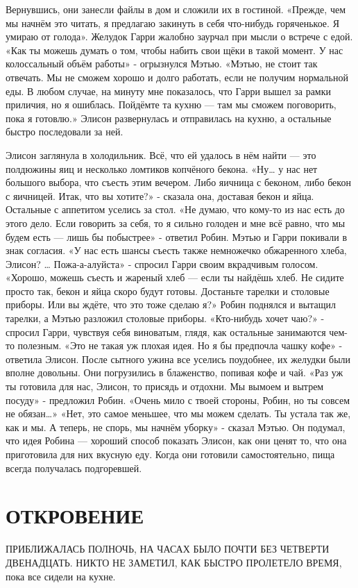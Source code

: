 \documentclass[a4paper,12pt]{book}
\begin{document}
	Вернувшись, они занесли файлы в дом и сложили их в гостиной.
	«Прежде, чем мы начнём это читать, я предлагаю закинуть в себя что-нибудь горяченькое. Я умираю от голода».
	Желудок Гарри жалобно заурчал при мысли о встрече с едой.
	«Как ты можешь думать о том, чтобы набить свои щёки в такой момент. У нас колоссальный объём работы» - огрызнулся Мэтью.
	«Мэтью, не стоит так отвечать. Мы не сможем хорошо и долго работать, если не получим нормальной еды. В любом случае, на минуту мне показалось, что Гарри вышел за рамки приличия, но я ошиблась. Пойдёмте та кухню — там мы сможем поговорить, пока я готовлю.»
	Элисон развернулась и отправилась на кухню, а остальные быстро последовали за ней.

	Элисон заглянула в холодильник. Всё, что ей удалось в нём найти — это полдюжины яиц и несколько ломтиков копчёного бекона.
	«Ну… у нас нет большого выбора, что съесть этим вечером. Либо яичница с беконом, либо бекон с яичницей. Итак, что вы хотите?» - сказала она, доставая бекон и яйца.
	Остальные с аппетитом уселись за стол.
	«Не думаю, что кому-то из нас есть до этого дело. Если говорить за себя, то я сильно голоден и мне всё равно, что мы будем есть — лишь бы побыстрее» - ответил Робин.
	Мэтью и Гарри покивали в знак согласия.
	«У нас есть шансы съесть также немножечко обжаренного хлеба, Элисон? … Пожа-а-алуйста» - спросил Гарри своим вкрадчивым голосом.
	«Хорошо, можешь съесть и жареный хлеб — если ты найдёшь хлеб. Не сидите просто так, бекон и яйца скоро будут готовы. Достаньте тарелки и столовые приборы. Или вы ждёте, что это тоже сделаю я?»
	Робин поднялся и вытащил тарелки, а Мэтью разложил столовые приборы.
	«Кто-нибудь хочет чаю?» - спросил Гарри, чувствуя себя виноватым, глядя, как остальные занимаются чем-то полезным.
	«Это не такая уж плохая идея. Но я бы предпочла чашку кофе» - ответила Элисон.
	После сытного ужина все уселись поудобнее, их желудки были вполне довольны. Они погрузились в блаженство, попивая кофе и чай.
	«Раз уж ты готовила для нас, Элисон, то присядь и отдохни. Мы вымоем и вытрем посуду» - предложил Робин.
	«Очень мило с твоей стороны, Робин, но ты совсем не обязан…»
	«Нет, это самое меньшее, что мы можем сделать. Ты устала так же, как и мы. А теперь, не спорь, мы начнём уборку» - сказал Мэтью.
	Он подумал, что идея Робина — хороший способ показать Элисон, как они ценят то, что она приготовила для них вкусную еду.
	Когда они готовили самостоятельно, пища всегда получалась подгоревшей.

\chapter{ОТКРОВЕНИЕ}
	ПРИБЛИЖАЛАСЬ ПОЛНОЧЬ, НА ЧАСАХ БЫЛО ПОЧТИ БЕЗ ЧЕТВЕРТИ ДВЕНАДЦАТЬ. НИКТО НЕ ЗАМЕТИЛ, КАК БЫСТРО ПРОЛЕТЕЛО ВРЕМЯ, пока все сидели на кухне.
\end{document}
